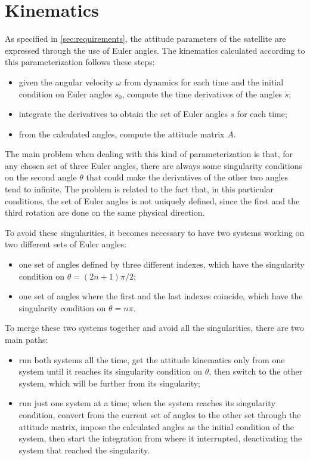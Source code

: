 \section{Kinematics}
\label{sec:kinematics}

As specified in \autoref{sec:requirements}, the attitude parameters of the satellite are expressed through the use of Euler angles. The kinematics calculated according to this parameterization follows these steps:

\begin{itemize}[wide,itemsep=3pt,topsep=3pt]
    \item given the angular velocity $\omega$ from dynamics for each time and the initial condition on Euler angles $s_0$, compute the time derivatives of the angles $\dot{s}$;
    \item integrate the derivatives to obtain the set of Euler angles $s$ for each time;
    \item from the calculated angles, compute the attitude matrix $A$.
\end{itemize}

The main problem when dealing with this kind of parameterization is that, for any chosen set of three Euler angles, there are always some singularity conditions on the second angle $\theta$ that could make the derivatives of the other two angles tend to infinite. The problem is related to the fact that, in this particular conditions, the set of Euler angles is not uniquely defined, since the first and the third rotation are done on the same physical direction.

To avoid these singularities, it becomes necessary to have two systems working on two different sets of Euler angles:

\begin{itemize}[wide,itemsep=3pt,topsep=3pt]
    \item one set of angles defined by three different indexes, which have the singularity condition on $\theta = (2n+1) \pi / 2$;
    \item one set of angles where the first and the last indexes coincide, which have the singularity condition on $\theta = n \pi$.
\end{itemize}

To merge these two systems together and avoid all the singularities, there are two main paths:

\begin{itemize}[wide,itemsep=3pt,topsep=3pt]
    \item run both systems all the time, get the attitude kinematics only from one system until it reaches its singularity condition on $\theta$, then switch to the other system, which will be further from its singularity;
    \item run just one system at a time; when the system reaches its singularity condition, convert from the current set of angles to the other set through the attitude matrix, impose the calculated angles as the initial condition of the system, then start the integration from where it interrupted, deactivating the system that reached the singularity.
\end{itemize}

